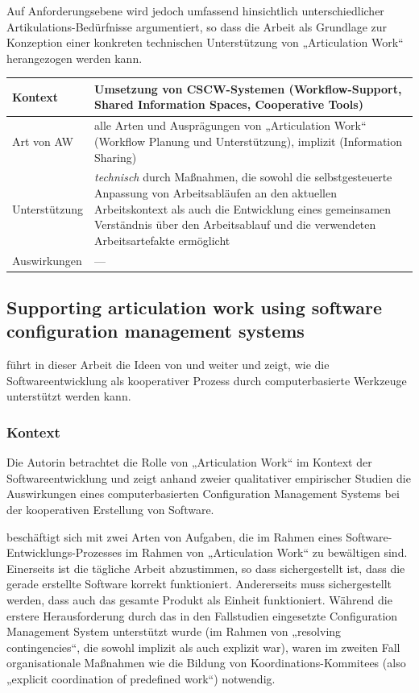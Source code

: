 Auf Anforderungsebene wird jedoch umfassend hinsichtlich unterschiedlicher Artikulations-Bedürfnisse argumentiert, so dass die Arbeit als Grundlage zur Konzeption einer konkreten technischen Unterstützung von „Articulation Work“ herangezogen werden kann.
\\[1em]
\begin{tabular}{| p{3cm} | p{10cm} |}
  \hline
  Kontext & Umsetzung von \gls{CSCW}-Systemen (Workflow-Support, Shared Information Spaces, Cooperative Tools)\\ \hline
  Art von AW & alle Arten und Ausprägungen von „Articulation Work“ (Workflow Planung und Unterstützung), implizit (Information Sharing)\\ \hline
  Unterstützung & \emph{technisch} durch Maßnahmen, die sowohl die selbstgesteuerte Anpassung von Arbeitsabläufen an den aktuellen Arbeitskontext als auch die Entwicklung eines gemeinsamen Verständnis über den Arbeitsablauf und die verwendeten Arbeitsartefakte ermöglicht \\ \hline
  Auswirkungen & --- \\ \hline
\end{tabular}

\subsection{Supporting articulation work using software configuration management systems}
\label{sub:supporting_articulation_work_using_software_configuration_management_systems}

\citet{Grinter96} führt in dieser Arbeit die Ideen von \citet{Bendifallah87} und \citet{Schmidt92} weiter und zeigt, wie die Softwareentwicklung als kooperativer Prozess durch computerbasierte Werkzeuge unterstützt werden kann.

\subsubsection{Kontext}

Die Autorin betrachtet die Rolle von „Articulation Work“ im Kontext der Softwareentwicklung und zeigt anhand zweier qualitativer empirischer Studien die Auswirkungen eines computerbasierten Configuration Management Systems bei der kooperativen Erstellung von Software. 

\citeauthor{Grinter96} beschäftigt sich mit zwei Arten von Aufgaben, die im Rahmen eines Software-Entwicklungs-Prozesses im Rahmen von „Articulation Work“ zu bewältigen sind. Einerseits ist die tägliche Arbeit abzustimmen, so dass sichergestellt ist, dass die gerade erstellte Software korrekt funktioniert. Andererseits muss sichergestellt werden, dass auch das gesamte Produkt als Einheit funktioniert. Während die erstere Herausforderung durch das in den Fallstudien eingesetzte Configuration Management System unterstützt wurde (im Rahmen von „resolving contingencies“, die sowohl implizit als auch explizit war), waren im zweiten Fall organisationale Maßnahmen wie die Bildung von Koordinations-Kommitees (also „explicit coordination of predefined work“) notwendig. 

